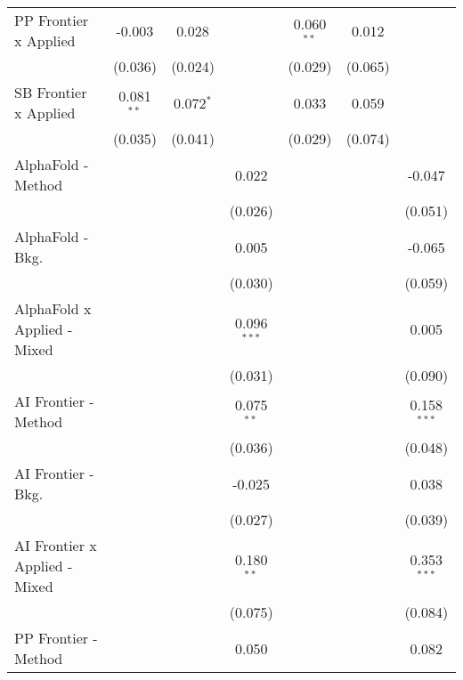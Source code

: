 \begin{tabular}{lcccccc}
   PP Frontier x Applied          & -0.003        & 0.028         &               & 0.060$^{**}$  & 0.012   &   \\   
                                  & (0.036)       & (0.024)       &               & (0.029)       & (0.065) &   \\   
   SB Frontier x Applied          & 0.081$^{**}$  & 0.072$^{*}$   &               & 0.033         & 0.059   &   \\   
                                  & (0.035)       & (0.041)       &               & (0.029)       & (0.074) &   \\   
   AlphaFold - Method             &               &               & 0.022         &               &         & -0.047\\   
                                  &               &               & (0.026)       &               &         & (0.051)\\   
   AlphaFold - Bkg.               &               &               & 0.005         &               &         & -0.065\\   
                                  &               &               & (0.030)       &               &         & (0.059)\\   
   AlphaFold x Applied - Mixed    &               &               & 0.096$^{***}$ &               &         & 0.005\\   
                                  &               &               & (0.031)       &               &         & (0.090)\\   
   AI Frontier - Method           &               &               & 0.075$^{**}$  &               &         & 0.158$^{***}$\\   
                                  &               &               & (0.036)       &               &         & (0.048)\\   
   AI Frontier - Bkg.             &               &               & -0.025        &               &         & 0.038\\   
                                  &               &               & (0.027)       &               &         & (0.039)\\   
   AI Frontier x Applied - Mixed  &               &               & 0.180$^{**}$  &               &         & 0.353$^{***}$\\   
                                  &               &               & (0.075)       &               &         & (0.084)\\   
   PP Frontier - Method           &               &               & 0.050         &               &         & 0.082\\   

\end{tabular}
